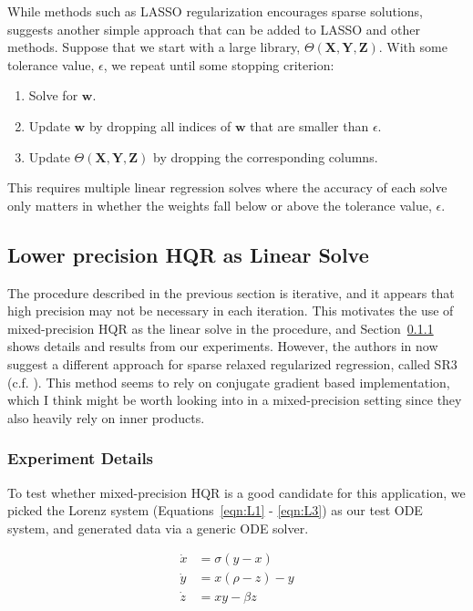 \documentclass{article}
\newcommand{\bb}[1]{\mathbf{#1}}
\theoremstyle{definition}
\begin{document}
While methods such as LASSO regularization encourages sparse solutions, \cite{Brunton2016} suggests another simple approach that can be added to LASSO and other methods. 
Suppose that we start with a large library, $\Theta(\bb{X}, \bb{Y}, \bb{Z}) $.
With some tolerance value, $\epsilon$, we repeat until some stopping criterion:
\begin{enumerate}[Step 1.]
	\item Solve for $\bb{w}$.
	\item Update $\bb{w}$ by dropping all indices of $\bb{w}$ that are smaller than $\epsilon$. 
	\item Update $\Theta(\bb{X}, \bb{Y}, \bb{Z})$ by dropping the corresponding columns.
\end{enumerate}

This requires multiple linear regression solves where the accuracy of each solve only matters in whether the weights fall below or above the tolerance value, $\epsilon$. 
\subsection{Lower precision HQR as Linear Solve}
The procedure described in the previous section is iterative, and it appears that high precision may not be necessary in each iteration. 
This motivates the use of mixed-precision HQR as the linear solve in the procedure, and Section~\ref{sec:ED} shows details and results from our experiments. 
However, the authors in \cite{Brunton2016}  now suggest a different approach for sparse relaxed regularized regression, called SR3 (c.f. \cite{Zheng2018}).
This method seems to rely on conjugate gradient based implementation, which I think might be worth looking into in a mixed-precision setting since they also heavily rely on inner products.\par

\subsubsection{Experiment Details} \label{sec:ED} 
To test whether mixed-precision HQR is a good candidate for this application, we picked the Lorenz system (Equations~\ref{eqn:L1} - \ref{eqn:L3}) as our test ODE system, and generated data via a generic ODE solver. 

\begin{align}
\dot{x} &= \sigma (y-x) \label{eqn:L1}\\
\dot{y} &= x(\rho -z)-y\label{eqn:L2} \\
\dot{z} &= xy - \beta z\label{eqn:L3}
\end{align}
\end{document}
